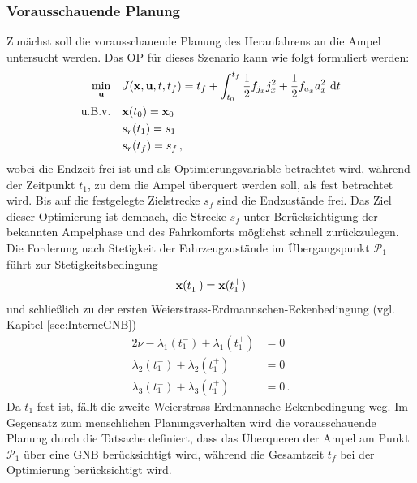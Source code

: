 \subsubsection{Vorausschauende Planung}\label{subsubsec:Vorausschauend}
Zunächst soll die vorausschauende Planung des Heranfahrens an die Ampel untersucht werden. Das \gls{OP} für dieses Szenario kann wie folgt formuliert werden:
\begin{align}
\min_{\boldsymbol{\mathrm{u}}} \quad & J(\boldsymbol{\mathrm{x}},\boldsymbol{\mathrm{u}},t,t_f) = t_f + \int_{t_0}^{t_f}\frac{1}{2}f_{j_x} j_x^2 + \frac{1}{2}f_{a_x} a_x^2~\textrm{d}{t} \\
\textrm{u.B.v.} \quad& \boldsymbol{\mathrm{x}}(t_0) = \boldsymbol{\mathrm{x}}_0 \\
& s_r(t_1) = s_1 \label{eq:srt1_gleich_s1}\\
& s_r(t_f ) = s_f\,,
\end{align}
wobei die Endzeit frei ist und als Optimierungsvariable betrachtet wird, während der Zeitpunkt $t_1$, zu dem die Ampel überquert werden soll, als fest betrachtet wird. Bis auf die festgelegte Zielstrecke $s_f$ sind die Endzustände frei. Das Ziel dieser Optimierung ist demnach, die Strecke $s_f$ unter Berücksichtigung der bekannten Ampelphase und des Fahrkomforts möglichst schnell zurückzulegen. Die Forderung nach Stetigkeit der Fahrzeugzustände im Übergangspunkt $\mathcal{P}_1$ führt zur Stetigkeitsbedingung 
\begin{equation}
\boldsymbol{\mathrm{x}}(t_1^-) = \boldsymbol{\mathrm{x}}(t_1^+)
\end{equation}
und schließlich zu der ersten Weierstrass-Erdmannschen-Eckenbedingung (vgl. Kapitel \ref{sec:InterneGNB})
\begin{align}
2\tilde{\nu} - \lambda_1(t_1^-) + \lambda_1(t_1^+) &= 0\\
\lambda_2(t_1^-) + \lambda_2(t_1^+) &= 0\\
\lambda_3(t_1^-) + \lambda_3(t_1^+) &= 0\,. \label{eq:l3tminus_l3tplus}
\end{align}
Da $t_1$ fest ist, fällt die zweite Weierstrass-Erdmannsche-Eckenbedingung weg. Im Gegensatz zum menschlichen Planungsverhalten wird die vorausschauende Planung durch die Tatsache definiert, dass das Überqueren der Ampel am Punkt $\mathcal{P}_1$ über eine \gls{GNB} berücksichtigt wird, während die Gesamtzeit $t_f$ bei der Optimierung berücksichtigt wird.

